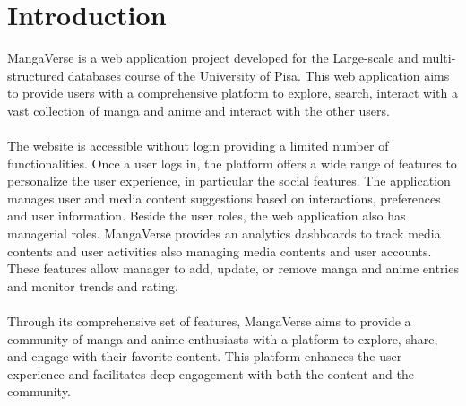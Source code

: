 \chapter{Introduction}



MangaVerse is a web application project developed for the Large-scale and multi-structured databases  
course of the University of Pisa. This web application aims to provide users with a 
comprehensive platform to explore, search, interact with a vast collection of 
manga and anime and interact with the other users. \\ \\
The website is accessible without login providing a limited number of functionalities.
Once a user logs in, the platform offers a wide range of features to personalize the user experience, in particular the social features.
The application manages user and media content suggestions based on interactions, preferences and user information.
Beside the user roles, the web application also has managerial roles. MangaVerse provides
an analytics dashboards to track media contents and user activities also managing media contents and 
user accounts. These features allow manager to add, update, or remove manga and anime entries
and monitor trends and rating. \\ \\
Through its comprehensive set of features, MangaVerse aims to provide a community of manga 
and anime enthusiasts with a platform to explore, share, and engage with their favorite
content. This platform enhances the user experience and facilitates deep engagement with 
both the content and the community.
